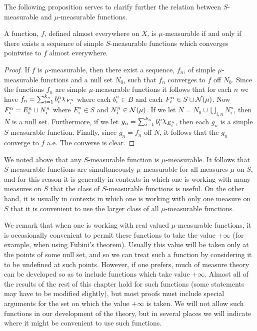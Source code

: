 The following proposition serves to clarify further the relation between $S$-measurable and $\mu$-measurable functions.

\begin{proposition}
A function, $f$, defined almost everywhere on $X$, is $\mu$-measurable if and only if there exists a sequence of simple $S$-measurable functions which converges pointwise to $f$ almost everywhere.
\end{proposition}

\begin{proof}
If $f$ is $\mu$-measurable, then there exist a sequence, $f_n$, of simple $\mu$-measurable functions and a null set $N_0$, such that $f_n$ converges to $f$ off $N_0$. Since the functions $f_n$ are simple $\mu$-measurable functions it follows that for each $n$ we have $f_n=\sum_{i=1}^{k_n}b_i^n\idf{F_i^n}$ where each $b_i^n\in B$ and each $F_i^n\in S\sqcup{\cal N}(\mu)$. Now $F_i^n=E_i^n\sqcup N_i^n$ where $E_i^n\in S$ and $N_i^n\in{\cal N}(\mu)$. If we let $N=N_0\cup\bigcup_{i, n} N_i^n$, then $N$ is a null set. Furthermore, if we let $g_n=\sum_{i=1}^{k_n}b_i^n\idf{E_i^n}$, then each $g_n$ is a simple $S$-measurable function. Finally, since $g_n=f_n$ off $N$, it follows that the $g_n$ converge to $f$ a.e. The converse is clear.
\end{proof}

We noted above that any $S$-measurable function is $\mu$-measurable. It follows that $S$-measurable functions are simultaneously $\mu$-measurable for all measures $\mu$ on $S$, and for this reason it is generally in contexts in which one is working with many measures on $S$ that the class of $S$-measurable functions is useful. On the other hand, it is usually in contexts in which one is working with only one measure on $S$ that it is convenient to use the larger class of all $\mu$-measurable functions.

We remark that when one is working with real valued $\mu$-measurable functions, it is occasionally convenient to permit these functions to take the value $+\infty$ (for example, when using Fubini's theorem). Usually this value will be taken only at the points of some null set, and so we can treat such a function by considering it to be undefined at such points. However, if one prefers, much of measure theory can be developed so as to include functions which take value $+\infty$. Almost all of the results of the rest of this chapter hold for such functions (some statements may have to be modified slightly), but most proofs must include special arguments for the set on which the value $+\infty$ is taken. We will not allow such functions in our development of the theory, but in several places we will indicate where it might be convenient to use such functions.

